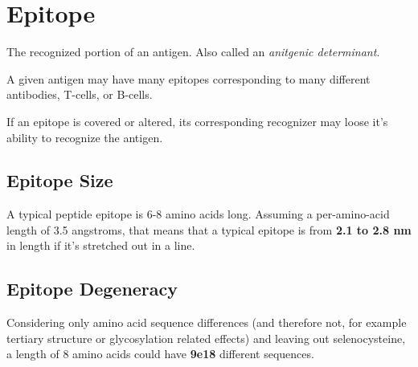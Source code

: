 \section{Epitope}
\label{Glossary:Epitope}

The recognized portion of an antigen.  Also called an \textit{anitgenic determinant}.

A given antigen may have many epitopes corresponding to many different antibodies, T-cells, or B-cells.

If an epitope is covered or altered, its corresponding recognizer may loose it's ability to recognize the antigen.

\subsection{Epitope Size}
A typical peptide epitope is 6-8 amino acids long.
Assuming a per-amino-acid length of 3.5 angstroms, that means that a typical epitope is from
\textbf{2.1 to 2.8 nm} in length if it's stretched out in a line.
\subsection{Epitope Degeneracy}
Considering only amino acid sequence differences (and therefore not, for example
tertiary structure or glycosylation related effects) and leaving out selenocysteine,
a length of 8 amino acids could have \textbf{9e18} different sequences.
